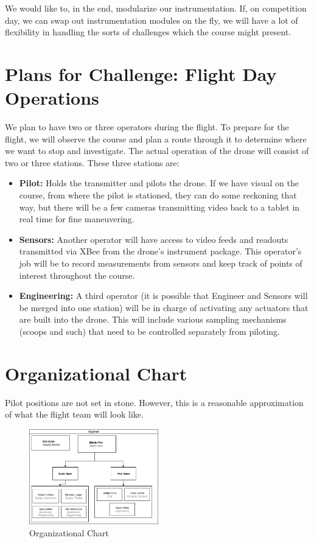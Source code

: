 We would like to, in the end, modularize our instrumentation. If, on competition day, we can swap out instrumentation modules on the fly, we will have a lot of flexibility in handling the sorts of challenges which the course might present.

\section{Plans for Challenge: Flight Day Operations}

We plan to have two or three operators during the flight. To prepare for the flight, we will observe the course and plan a route through it to determine where we want to stop and investigate. The actual operation of the drone will consist of two or three stations. These three stations are:

\begin{itemize}
\item \textbf{Pilot:} Holds the transmitter and pilots the drone. If we have visual on the course, from where the pilot is stationed, they can do some reckoning that way, but there will be a few cameras transmitting video back to a tablet in real time for fine maneuvering.
\item \textbf{Sensors:} Another operator will have access to video feeds and readouts transmitted via XBee from the drone's instrument package. This operator's job will be to record measurements from sensors and keep track of points of interest throughout the course.
\item \textbf{Engineering:} A third operator (it is possible that Engineer and Sensors will be merged into one station) will be in charge of activating any actuators that are built into the drone. This will include various sampling mechanisms (scoops and such) that need to be controlled separately from piloting.
\end{itemize}

\section{Organizational Chart}

Pilot positions are not set in stone. However, this is a reasonable approximation of what the flight team will look like.

\begin{figure}[!htbp]
\centering 
        \includegraphics[width=0.5\textwidth]{figs/org_chart.png}
\caption[Organizational Chart]{Organizational Chart}
\label{fig:orgchart} 
\end{figure}

